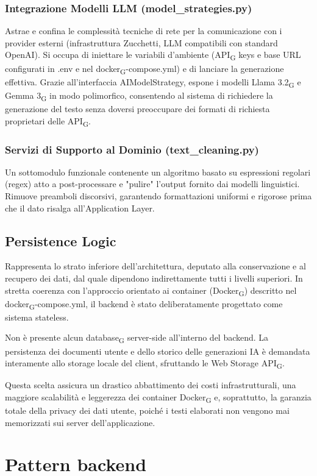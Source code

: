 \documentclass[11pt,a4paper]{article}
\newcommand{\gls}[1]{#1\textsubscript{G}}
\begin{document}
\subsubsection{Integrazione Modelli LLM (model\_strategies.py)}
Astrae e confina le complessità tecniche di rete per la comunicazione con i provider esterni (infrastruttura Zucchetti, LLM compatibili con standard OpenAI). Si occupa di iniettare le variabili d'ambiente (\gls{API} keys e base URL configurati in .env e nel \gls{docker}-compose.yml) e di lanciare la generazione effettiva. Grazie all'interfaccia AIModelStrategy, espone i modelli \gls{Llama 3.2} e \gls{Gemma 3} in modo polimorfico, consentendo al sistema di richiedere la generazione del testo senza doversi preoccupare dei formati di richiesta proprietari delle \gls{API}.

\subsubsection{Servizi di Supporto al Dominio (text\_cleaning.py)}
Un sottomodulo funzionale contenente un algoritmo basato su espressioni regolari (regex) atto a post-processare e "pulire" l'output fornito dai modelli linguistici. Rimuove preamboli discorsivi, garantendo formattazioni uniformi e rigorose prima che il dato risalga all'Application Layer.


\subsection{Persistence Logic}
Rappresenta lo strato inferiore dell'architettura, deputato alla conservazione e al recupero dei dati, dal quale dipendono indirettamente tutti i livelli superiori. In stretta coerenza con l'approccio orientato ai container (\gls{Docker}) descritto nel \gls{docker}-compose.yml, il backend è stato deliberatamente progettato come sistema stateless.

Non è presente alcun \gls{database} server-side all'interno del backend. La persistenza dei documenti utente e dello storico delle generazioni IA è demandata interamente allo storage locale del client, sfruttando le Web Storage \gls{API}.

Questa scelta assicura un drastico abbattimento dei costi infrastrutturali, una maggiore scalabilità e leggerezza dei container \gls{Docker} e, soprattutto, la garanzia totale della privacy dei dati utente, poiché i testi elaborati non vengono mai memorizzati sui server dell'applicazione.

\section{Pattern backend}
\end{document}
